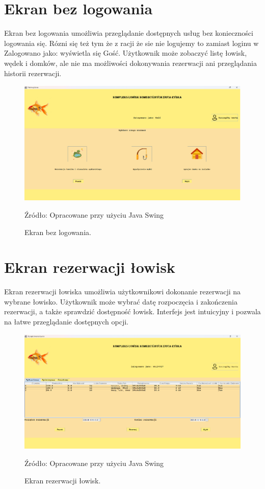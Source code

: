 \section{Ekran bez logowania}
Ekran bez logowania umożliwia przeglądanie dostępnych usług bez konieczności logowania się. Rózni się też tym że z racji że sie nie logujemy to zamiast loginu w Zalogowano jako: wyświetla się Gość. Użytkownik może zobaczyć listę łowisk, wędek i domków, ale nie ma możliwości dokonywania rezerwacji ani przeglądania historii rezerwacji.
\begin{figure}[H]
    \centering
    \includegraphics[width=0.8\linewidth]{figures/without.eps}
    \caption{Ekran bez logowania.}
    \label{fig:without_login_screen}
    \small{Źródło: Opracowane przy użyciu Java Swing}
\end{figure}


\section{Ekran rezerwacji łowisk}
Ekran rezerwacji łowiska umożliwia użytkownikowi dokonanie rezerwacji na wybrane łowisko. Użytkownik może wybrać datę rozpoczęcia i zakończenia rezerwacji, a także sprawdzić dostępność łowisk. Interfejs jest intuicyjny i pozwala na łatwe przeglądanie dostępnych opcji.
\begin{figure}[H]
    \centering
    \includegraphics[width=0.8\linewidth]{figures/lakes.eps}
    \caption{Ekran rezerwacji łowisk.}
    \label{fig:lakes_screen}
    \small{Źródło: Opracowane przy użyciu Java Swing}
\end{figure}


